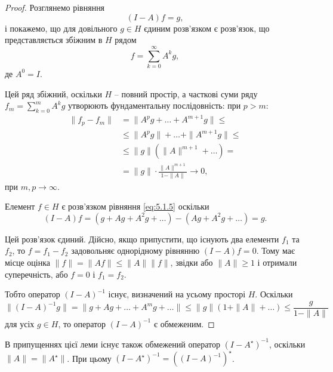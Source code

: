 \begin{proof}
    Розглянемо рівняння
    \begin{equation}
        \label{eq:5.1.5}
        (I - A) f = g,
    \end{equation}
    і покажемо, що для довільного $g \in H$ єдиним розв'язком є розв'язок, що представляється збіжним в $H$ рядом
    \begin{equation}
        \label{eq:5.1.6}
        f = \sum_{k = 0}^\infty A^k g,
    \end{equation}
    де $A^0 = I$. \medskip

    Цей ряд збіжний, оскільки $H$ -- повний простір, а часткові суми ряду  $f_m = \sum_{k = 0}^m A^k g$ утворюють фундаментальну послідовність: при $p > m$:
    \begin{align*}
        \|f_p - f_m\|
        &= \|A^p g + \ldots + A^{m + 1} g\| \le \\
        &\le \|A^p g\| + \ldots + \|A^{m + 1} g\| \le \\
        &\le \|g\| \left( \|A\|^{m + 1} + \ldots \right) = \\
        &= \|g\| \cdot \frac{\|A\|^{m + 1}}{1 - \|A\|} \to 0,
    \end{align*}
    при $m, p \to \infty$. \medskip

    Елемент $f \in H$ є розв'язком рівняння \eqref{eq:5.1.5} оскільки
    \begin{equation*}
        (I - A) f = (g + A g + A^2 g + \ldots) - (A g + A^2 g + \ldots) = g.    
    \end{equation*}

    Цей розв'язок єдиний. Дійсно, якщо припустити, що існують два елементи $f_1$ та $f_2$, то $f = f_1 - f_2$ задовольняє однорідному рівнянню $(I - A) f = 0$. Тому має місце оцінка $\|f\| = \|A f\| \le \|A\| \|f\|$, звідки або $\|A\| \ge 1$ і отримали суперечність, або $f = 0$ і $f_1 = f_2$. \medskip

    Тобто оператор $(I - A)^{-1}$ існує, визначений на усьому просторі $H$. Оскільки
    \begin{equation*}
        \|(I - A)^{-1} g\| = \|g + A g + \ldots + A^m g + \ldots\| \le \|g\| (1 + \|A\| + \ldots) \le \frac{g}{1 - \|A\|}
    \end{equation*}
    для усіх $g \in H$, то оператор $(I - A)^{-1}$ є обмеженим. 
\end{proof}

\begin{remark}
    В припущеннях цієї леми існує також обмежений оператор $(I - A^\star)^{-1}$, оскільки $\|A\| = \|A^\star\|$. При цьому $(I - A^\star)^{-1} = \left( (I - A)^{-1} \right)^\star$.
\end{remark}

